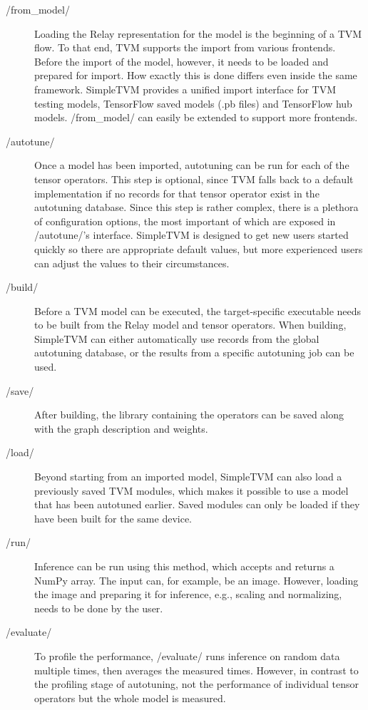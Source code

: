 \begin{description}
	\item[\pythoninline/from_model/] Loading the Relay representation for the model is the beginning of a TVM flow. To that end, TVM supports the import from various frontends. Before the import of the model, however, it needs to be loaded and prepared for import. How exactly this is done differs even inside the same framework. SimpleTVM provides a unified import interface for TVM testing models, TensorFlow saved models (.pb files) and TensorFlow hub models. \pythoninline/from_model/ can easily be extended to support more frontends.
	\item[\pythoninline/autotune/] Once a model has been imported, autotuning can be run for each of the tensor operators. This step is optional, since TVM falls back to a default implementation if no records for that tensor operator exist in the autotuning database. Since this step is rather complex, there is a plethora of configuration options, the most important of which are exposed in \pythoninline/autotune/'s interface. SimpleTVM is designed to get new users started quickly so there are appropriate default values, but more experienced users can adjust the values to their circumstances.
	\item[\pythoninline/build/] Before a TVM model can be executed, the target-specific executable needs to be built from the Relay model and tensor operators. When building, SimpleTVM can either automatically use records from the global autotuning database, or the results from a specific autotuning job can be used.
	\item[\pythoninline/save/] After building, the library containing the operators can be saved along with the graph description and weights.
	\item[\pythoninline/load/] Beyond starting from an imported model, SimpleTVM can also load a previously saved TVM modules, which makes it possible to use a model that has been autotuned earlier. Saved modules can only be loaded if they have been built for the same device.
	\item[\pythoninline/run/] Inference can be run using this method, which accepts and returns a NumPy array. The input can, for example, be an image. However, loading the image and preparing it for inference, e.g., scaling and normalizing, needs to be done by the user.
	\item[\pythoninline/evaluate/] To profile the performance, \pythoninline/evaluate/ runs inference on random data multiple times, then averages the measured times. However, in contrast to the profiling stage of autotuning, not the performance of individual tensor operators but the whole model is measured.
\end{description}

